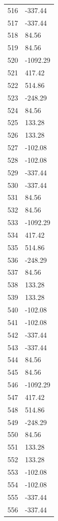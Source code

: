 \documentclass[a4paper,11pt]{article}
\begin{document}
\begin{center}
\begin{longtable}{|R{1.5cm}|R{2.5cm}|}
  516 &      -337.44 \\
  517 &      -337.44 \\
  518 &        84.56 \\
  519 &        84.56 \\
  520 &     -1092.29 \\
  521 &       417.42 \\
  522 &       514.86 \\
  523 &      -248.29 \\
  524 &        84.56 \\
  525 &       133.28 \\
  526 &       133.28 \\
  527 &      -102.08 \\
  528 &      -102.08 \\
  529 &      -337.44 \\
  530 &      -337.44 \\
  531 &        84.56 \\
  532 &        84.56 \\
  533 &     -1092.29 \\
  534 &       417.42 \\
  535 &       514.86 \\
  536 &      -248.29 \\
  537 &        84.56 \\
  538 &       133.28 \\
  539 &       133.28 \\
  540 &      -102.08 \\
  541 &      -102.08 \\
  542 &      -337.44 \\
  543 &      -337.44 \\
  544 &        84.56 \\
  545 &        84.56 \\
  546 &     -1092.29 \\
  547 &       417.42 \\
  548 &       514.86 \\
  549 &      -248.29 \\
  550 &        84.56 \\
  551 &       133.28 \\
  552 &       133.28 \\
  553 &      -102.08 \\
  554 &      -102.08 \\
  555 &      -337.44 \\
  556 &      -337.44 \\

\end{longtable}
\end{center}
\end{document}
